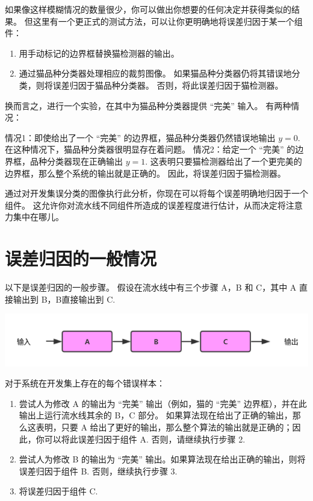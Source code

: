 如果像这样模糊情况的数量很少，你可以做出你想要的任何决定并获得类似的结果。
但这里有一个更正式的测试方法，可以让你更明确地将误差归因于某一个组件：

\begin{enumerate}
\def\labelenumi{\arabic{enumi}.}
\tightlist
\item
  用手动标记的边界框替换猫检测器的输出。
\item
  通过猫品种分类器处理相应的裁剪图像。
  如果猫品种分类器仍将其错误地分类，则将误差归因于猫品种分类器。
  否则，将此误差归因于猫检测器。
\end{enumerate}

换而言之，进行一个实验，在其中为猫品种分类器提供 ``完美'' 输入。
有两种情况：

情况1：即使给出了一个 ``完美'' 的边界框，猫品种分类器仍然错误地输出
\(y = 0\). 在这种情况下，猫品种分类器很明显存在着问题。 情况2：给定一个
``完美'' 的边界框，品种分类器现在正确输出 \(y = 1\).
这表明只要猫检测器给出了一个更完美的边界框，那么整个系统的输出就是正确的。
因此，将误差归因于猫检测器。

通过对开发集误分类的图像执行此分析，你现在可以将每个误差明确地归因于一个组件。
这允许你对流水线不同组件所造成的误差程度进行估计，从而决定将注意力集中在哪儿。

\hypertarget{ux8befux5deeux5f52ux56e0ux7684ux4e00ux822cux60c5ux51b5}{%
\chapter{误差归因的一般情况}\label{ux8befux5deeux5f52ux56e0ux7684ux4e00ux822cux60c5ux51b5}}

以下是误差归因的一般步骤。 假设在流水线中有三个步骤 A，B 和 C，其中 A
直接输出到 B，B直接输出到 C.

\includegraphics{./img/ch55_01.png}

对于系统在开发集上存在的每个错误样本：

\begin{enumerate}
\def\labelenumi{\arabic{enumi}.}
\tightlist
\item
  尝试人为修改 A 的输出为 ``完美'' 输出（例如，猫的 ``完美''
  边界框），并在此输出上运行流水线其余的 B，C 部分。
  如果算法现在给出了正确的输出，那么这表明，只要 A
  给出了更好的输出，那么整个算法的输出就是正确的；因此，你可以将此误差归因于组件
  A. 否则，请继续执行步骤 2.
\item
  尝试人为修改 B 的输出为 ``完美''
  输出。如果算法现在给出正确的输出，则将误差归因于组件 B.
  否则，继续执行步骤 3.
\item
  将误差归因于组件 C.
\end{enumerate}

